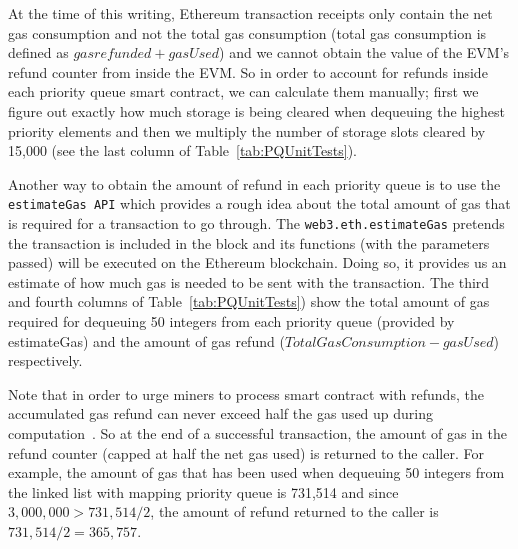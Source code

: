 At the time of this writing, Ethereum transaction receipts only contain the net gas consumption and not the total gas consumption (total gas consumption is defined as $gas refunded + gasUsed$) and we cannot obtain the value of the EVM's refund counter from inside the EVM. So in order to account for refunds inside each priority queue smart contract, we can calculate them manually; first we figure out exactly how much storage is being cleared when dequeuing the highest priority elements and then we multiply the number of storage slots cleared by 15,000 (see the last column of Table~\ref{tab:PQUnitTests}).

Another way to obtain the amount of refund in each priority queue is to use the \texttt{estimateGas API} which provides a rough idea about the total amount of gas that is required for a transaction to go through. The \texttt{web3.eth.estimateGas} pretends the transaction is included in the block and its functions (with the parameters passed) will be executed on the Ethereum blockchain. Doing so, it provides us an estimate of how much gas is needed to be sent with the transaction. The third and fourth columns of Table~\ref{tab:PQUnitTests}) show the total amount of gas required for dequeuing 50 integers from each priority queue (provided by estimateGas) and the amount of gas refund ($Total Gas Consumption - gasUsed$) respectively.

Note that in order to urge miners to process smart contract with refunds, the accumulated gas refund can never exceed half the gas used up during computation~\cite{wood2014ethereum}. So at the end of a successful transaction, the amount of gas in the refund counter (capped at half the net gas used) is returned to the caller. For example, the amount of gas that has been used when dequeuing 50 integers from the linked list with mapping priority queue is 731,514 and since $3,000,000 > 731,514/2$, the amount of refund returned to the caller is $731,514/2 = 365,757$.





